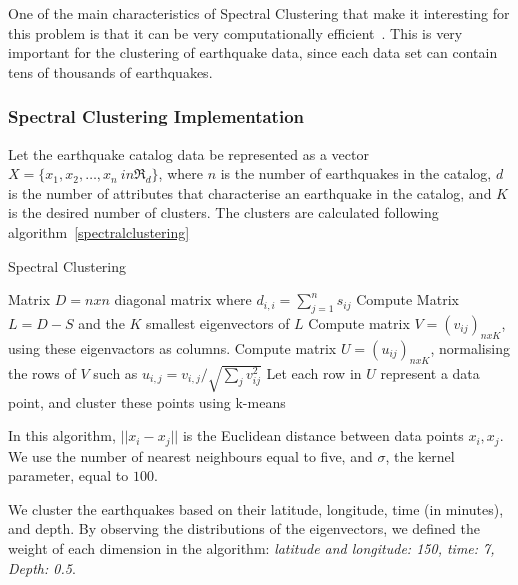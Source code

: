 One of the main characteristics of Spectral Clustering that make it
interesting for this problem is that it can be very computationally
efficient~\cite{Ye2016}. This is very important for the clustering of
earthquake data, since each data set can contain tens of thousands of
earthquakes.

\subsubsection*{Spectral Clustering Implementation}

Let the earthquake catalog data be represented as a vector $X = \{x_1,
x_2, \ldots, x_n\ in \Re_d\}$, where $n$ is the number of earthquakes
in the catalog, $d$ is the number of attributes that characterise an
earthquake in the catalog, and $K$ is the desired number of
clusters. The clusters are calculated following
algorithm~\ref{spectralclustering}

\begin{algorithm}[H]
  \caption{Spectral Clustering}
  \label{spectralclustering}
  \begin{algorithmic}
    \ENDFOR
    \STATE Matrix $D = n x n$ diagonal matrix where $d_{i,i} = \sum^n_{j=1}s_{ij}$
    \STATE Compute Matrix $L = D - S$ and the $K$ smallest eigenvectors of $L$
    \STATE Compute matrix $V = (v_{ij})_{nxK}$, using these eigenvactors as columns.
    \STATE Compute matrix $U = (u_{ij})_{nxK}$, normalising the rows
    of $V$ such as $u_{i,j} = v_{i,j}/\sqrt{\sum_jv^2_{ij}}$
    \STATE Let each row in $U$ represent a data point, and cluster
    these points using k-means
  \end{algorithmic}
\end{algorithm}

In this algorithm, $||x_i-x_j||$ is the Euclidean distance between
data points $x_i,x_j$. We use the number of nearest neighbours equal to
five, and $\sigma$, the kernel parameter, equal to $100$.

We cluster the earthquakes based on their latitude, longitude, time
(in minutes), and depth. By observing the distributions of the
eigenvectors, we defined the weight of each dimension in the
algorithm: \emph{latitude and longitude: 150, time: 7, Depth: 0.5}.
